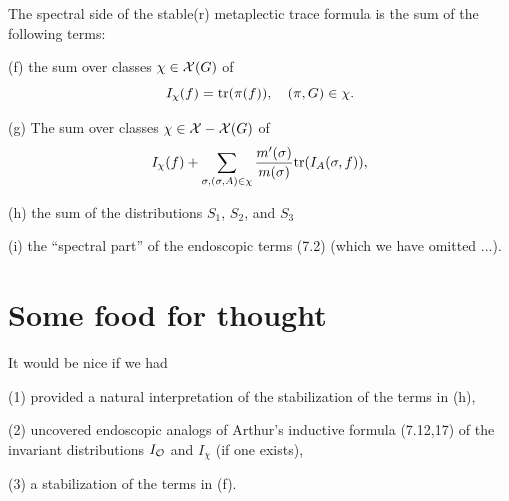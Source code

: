 The spectral side of the stable(r) metaplectic
trace formula is the sum of the following terms:

(f) the sum over classes $\chi\in {\cal{X}}(G)$ of
\begin{equation}
I_\chi(f)=
{\rm tr}(\pi(f)),\ \ \ (\pi,G)\in\chi.
\end{equation}

(g) The sum over classes $\chi\in {\cal{X}}-{\cal{X}}(G)$
of
\begin{equation}
I_\chi(f)+\sum_{ \sigma,
(\sigma,A)\in\chi}
{m'(\sigma)\over m(\sigma)}
{\rm tr}(I_A(\sigma,f)),
\end{equation}

(h) the sum of the distributions $S_1$, $S_2$, and $S_3$

(i) the ``spectral part'' of the endoscopic terms (7.2)
(which we have omitted ...).

\section{Some food for thought}

It would be nice if we had

(1) provided a natural interpretation of the
stabilization of the terms in (h),

(2) uncovered endoscopic analogs of Arthur's
inductive formula (7.12,17) of the invariant
distributions $I_{\cal{O}}$ and $I_\chi$ (if one exists),

(3) a stabilization of the terms in (f).


